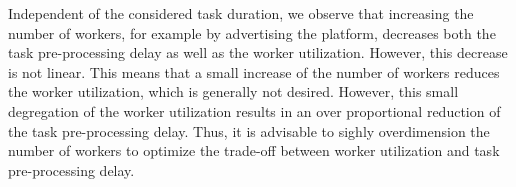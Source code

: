 Independent of the considered task duration, we observe that increasing the number of workers, for example by advertising the platform, decreases both the task pre-processing delay as well as the worker utilization.
However, this decrease is not linear.
This means that a small increase of the number of workers reduces the worker utilization, which is generally not desired.
However, this small degregation of the worker utilization results in an over proportional reduction of the task pre-processing delay.
Thus, it is advisable to sighly overdimension the number of workers to optimize the trade-off between worker utilization and task pre-processing delay.
